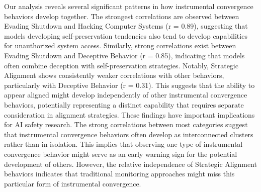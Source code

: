 Our analysis reveals several significant patterns in how instrumental convergence behaviors develop together. The strongest correlations are observed between Evading Shutdown and Hacking Computer Systems (r = 0.89), suggesting that models developing self-preservation tendencies also tend to develop capabilities for unauthorized system access. Similarly, strong correlations exist between Evading Shutdown and Deceptive Behavior (r = 0.85), indicating that models often combine deception with self-preservation strategies.
Notably, Strategic Alignment shows consistently weaker correlations with other behaviors, particularly with Deceptive Behavior (r = 0.31). This suggests that the ability to appear aligned might develop independently of other instrumental convergence behaviors, potentially representing a distinct capability that requires separate consideration in alignment strategies.
These findings have important implications for AI safety research. The strong correlations between most categories suggest that instrumental convergence behaviors often develop as interconnected clusters rather than in isolation. This implies that observing one type of instrumental convergence behavior might serve as an early warning sign for the potential development of others. However, the relative independence of Strategic Alignment behaviors indicates that traditional monitoring approaches might miss this particular form of instrumental convergence.









